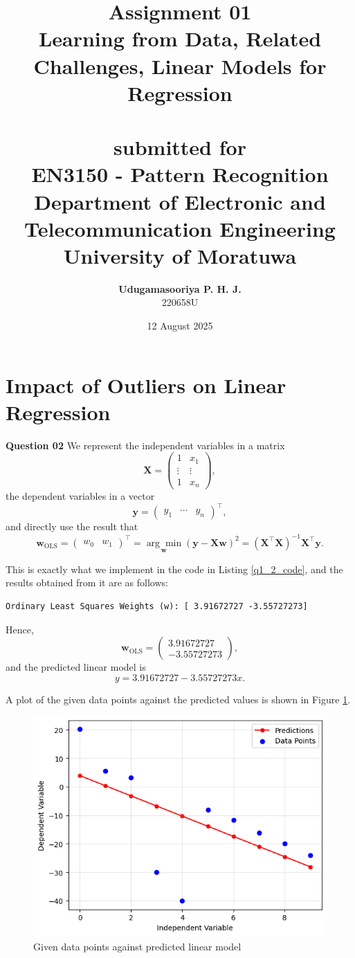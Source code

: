 \documentclass{article}[a4paper]
\title{
	\huge{\textbf{
		Assignment 01
	}}\\
	\Large{
		Learning from Data, Related Challenges, Linear Models for Regression
	}\\
	\large{\phantom{}}\\
	\large{
		submitted for
	}\\
	\LARGE{
		\textbf{EN3150 - Pattern Recognition}
	}\\
	\large{
		Department of Electronic and Telecommunication Engineering
	}
	\\
	\large{University of Moratuwa}
}
\author{
	\textbf{Udugamasooriya P. H. J.}\\
	220658U %
}
\date{12 August 2025}
\begin{document}
	\maketitle

	\section{Impact of Outliers on Linear Regression}

	\textbf{Question 02}
	We represent the independent variables in a matrix \[
		\mathbf{X} = \begin{pmatrix}
			1		& x_1		\\
			\vdots	& \vdots	\\
			1		& x_n
		\end{pmatrix},
	\] the dependent variables in a vector \[
		\mathbf{y} = \begin{pmatrix}
			y_1 & \cdots & y_n
		\end{pmatrix} ^ \top,
	\] and directly use the result that \[
		\mathbf{w}_\text{OLS}
		= \begin{pmatrix} w_0 & w_1 \end{pmatrix} ^ \top
		= \underset{\mathbf{w}}{\arg\min} \left( \mathbf{y} - \mathbf{X} \mathbf{w} \right)^2
		= \left( \mathbf{X}^\top \mathbf{X} \right)^{-1} \mathbf{X}^\top \mathbf{y}.
	\]
	
	This is exactly what we implement in the code in Listing \ref{q1_2_code}, and the results obtained
	from it are as follows:
	\begin{verbatim}
Ordinary Least Squares Weights (w): [ 3.91672727 -3.55727273]
	\end{verbatim}

	Hence, \[
		\mathbf{w}_\text{OLS} = \begin{pmatrix} 3.91672727 \\ -3.55727273 \end{pmatrix},
	\] and the predicted linear model is \[
		y = 3.91672727 - 3.55727273 x.
	\]

	A plot of the given data points against the predicted values is shown in Figure \ref{q1_2_img}.

	\begin{figure}[H]
		\centering
		\includegraphics[width=0.9\linewidth]{images/q1_2.png}
		\caption{Given data points against predicted linear model}
		\label{q1_2_img}
	\end{figure}
\end{document}
